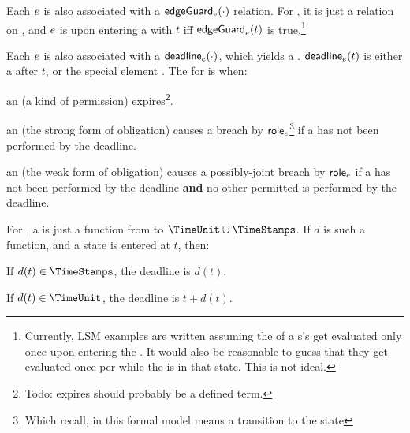 \documentclass[12pt]{article}
\begin{document}
\medskip

Each \transition $e$ is also associated with a  $\textsf{edgeGuard}_{e}(\cdot)$ relation. For \FSContracts, it is just a relation on \TimeStamps,
and \atransition $e$ is  upon entering a \GlobalState with \TimeStamp $t$ iff $\textsf{edgeGuard}_{e}(t)$ is true.\footnote{Currently, LSM examples are written assuming the \TGuards of a \State s's \transitions get evaluated only once upon entering the \State. It would also be reasonable to guess that they get evaluated once per \TimeUnit while the \Contract is in that state. This is not ideal.}

\medskip

Each \transition $e$ is also associated with a  $\textsf{deadline}_{e}(\cdot)$, which yields a . $\textsf{deadline}_{e}(t)$ is either a \TimeStamp after $t$, or the special element . The \Deadline for \atransition is when:

\begin{LPPI}
	\item an \enabled \mayntran (a kind of permission) expires\footnote{Todo: expires should probably be a defined term.}.
	\item an \enabled \mustntran (the strong form of obligation) causes a breach by $\textsf{role}_{e}$\footnote{Which recall, in this formal model means a transition to the state \breached{\{\role{\evar}\}}} if a \compatible \Event has not been performed by the deadline.
	\item an \enabled \rmustntran (the weak form of obligation) causes a possibly-joint breach by $\textsf{role}_{e}$ if a \compatible \Event has not been performed by the deadline {\bf and} no other permitted \Event is performed by the deadline.
	\end{LPPI}
For \FSContracts, a \DeadlineFn is just a function from \TimeStamps to $\TimeUnit \cup \TimeStamps$. If $d$ is such a function, and a state is entered at \TimeStamp $t$, then:
\begin{LPPI}
\item If $d(t) \in \TimeStamps$, the deadline is $d(t)$.
	\item If $d(t) \in \TimeUnit$, the deadline is $t + d(t)$.
\end{LPPI}
\end{document}
